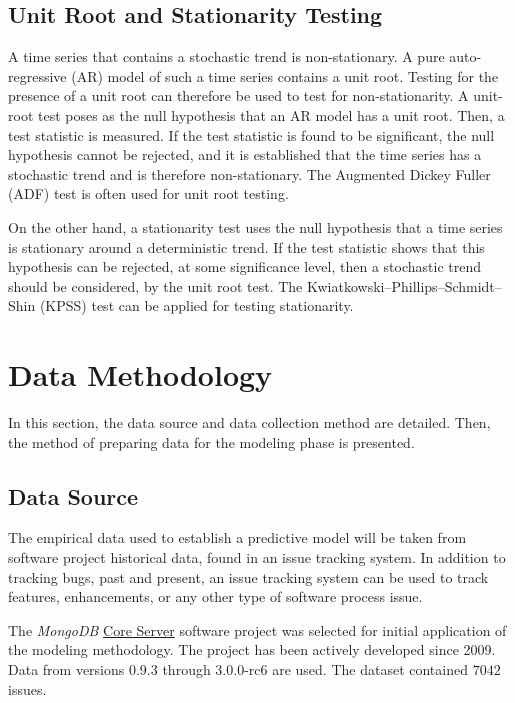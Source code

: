 \documentclass[letterpaper]{report}
\begin{document}
\section*{Unit Root and Stationarity Testing}
A time series that contains a stochastic trend is non-stationary. A pure auto-regressive (AR) model of such a time series contains a unit root\cite{franses1998time}. Testing for the presence of a unit root can therefore be used to test for non-stationarity. A unit-root test poses as the null hypothesis that an AR model has a unit root. Then, a test statistic is measured. If the test statistic is found to be significant, the null hypothesis cannot be rejected, and it is established that the time series has a stochastic trend and is therefore non-stationary. The Augmented Dickey Fuller (ADF) test is often used for unit root testing.

On the other hand, a stationarity test uses the null hypothesis that a time series is stationary around a deterministic trend. If the test statistic shows that this hypothesis can be rejected, at some significance level, then a stochastic trend should be considered, by the unit root test. The Kwiatkowski–Phillips–Schmidt–Shin (KPSS) test can be applied for testing stationarity.

\chapter{Data Methodology}
\label{sec:data_methodology}

In this section, the data source and data collection method are detailed. Then, the method of preparing data for the modeling phase is presented.

\section*{Data Source}
The empirical data used to establish a predictive model will be taken from software project historical data, found in an issue tracking system. In addition to tracking bugs, past and present, an issue tracking system can be used to track features, enhancements, or any other type of software process issue. 

The \textit{MongoDB} \href{https://jira.mongodb.org/browse/SERVER}{Core Server} software project was selected for initial application of the modeling methodology. The project has been actively developed since 2009. Data from versions 0.9.3 through 3.0.0-rc6 are used. The dataset contained $7042$ issues.
\end{document}
